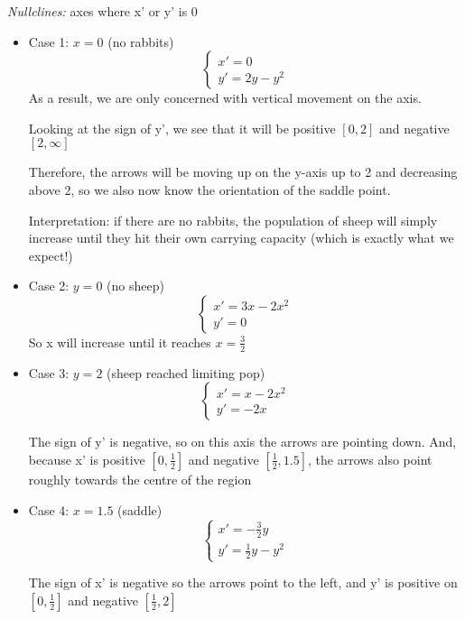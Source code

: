 \documentclass[12pt]{article}
\begin{document}
\emph{Nullclines:} axes where x' or y' is 0

\begin{itemize}
    \item Case 1: $x = 0$ (no rabbits)
        \[\begin{cases}
            x' = 0\\
            y' = 2y - y^2
        \end{cases}\]
        As a result, we are only concerned with vertical movement on the axis.

        Looking at the sign of y', we see that it will be positive $[0, 2]$ and negative $[2, \infty]$

        Therefore, the arrows will be moving up on the y-axis up to 2 and decreasing above 2, so we also now know the orientation of the saddle point.

        Interpretation: if there are no rabbits, the population of sheep will simply increase until they hit their own carrying capacity (which is exactly what we expect!)

    \item Case 2: $y = 0$ (no sheep)
    \[\begin{cases}
        x' = 3x - 2x^2\\
        y' = 0
    \end{cases}\]
    So x will increase until it reaches $x = \frac{3}{2}$

    \item Case 3: $y = 2$ (sheep reached limiting pop)
        \[\begin{cases}
            x' = x - 2x^2\\
            y' = -2x
        \end{cases}\]

        The sign of y' is negative, so on this axis the arrows are pointing down. And, because x' is positive $[0, \frac{1}{2}]$ and negative $[\frac{1}{2}, 1.5]$, the arrows also point roughly towards the centre of the region 

    \item Case 4: $x = 1.5$ (saddle)
        \[\begin{cases}
            x' = - \frac{3}{2}y\\
            y' = \frac{1}{2}y - y^2
        \end{cases}\]

        The sign of x' is negative so the arrows point to the left, and y' is positive on $[0, \frac{1}{2}]$ and negative $[\frac{1}{2}, 2]$
\end{itemize}
\end{document}
